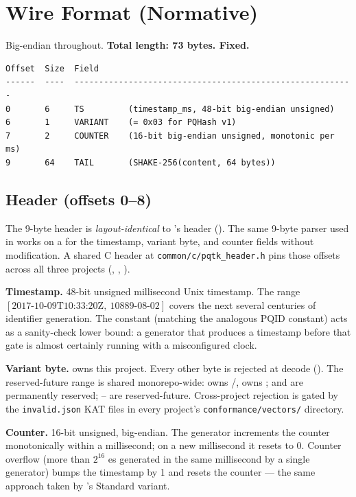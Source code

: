 \section{Wire Format (Normative)}
\label{sec:wire-format}

Big-endian throughout. \textbf{Total length: 73 bytes. Fixed.}

\begin{lstlisting}[language=Pseudocode]
Offset  Size  Field
------  ----  ---------------------------------------------------------
0       6     TS         (timestamp_ms, 48-bit big-endian unsigned)
6       1     VARIANT    (= 0x03 for PQHash v1)
7       2     COUNTER    (16-bit big-endian unsigned, monotonic per ms)
9       64    TAIL       (SHAKE-256(content, 64 bytes))
\end{lstlisting}

\subsection{Header (offsets 0--8)}

The 9-byte header is \emph{layout-identical} to \pqid{}'s header (). The same 9-byte parser used in \pqid{} works on a \pqhash{} for the timestamp, variant byte, and counter fields without modification. A shared C header at \texttt{common/c/pqtk\_header.h} pins those offsets across all three \pqtoolkit{} projects (\pqid{}, \pqhash{}, \pqcrypt{}).

\textbf{Timestamp.} 48-bit unsigned millisecond Unix timestamp. The range $[2017\text{-}10\text{-}09\text{T}10\text{:}33\text{:}20\text{Z},\ 10889\text{-}08\text{-}02]$ covers the next several centuries of identifier generation. The constant  (matching the analogous PQID constant) acts as a sanity-check lower bound: a generator that produces a timestamp before that gate is almost certainly running with a misconfigured clock.

\textbf{Variant byte.}  owns this project. Every other byte is rejected at decode (). The reserved-future range is shared monorepo-wide: \pqid{} owns /, \pqcrypt{} owns ;  and  are permanently reserved; -- are reserved-future. Cross-project rejection is gated by the \texttt{invalid.json} KAT files in every project's \texttt{conformance/vectors/} directory.

\textbf{Counter.} 16-bit unsigned, big-endian. The generator increments the counter monotonically within a millisecond; on a new millisecond it resets to 0. Counter overflow (more than $2^{16}$ \pqhash{}es generated in the same millisecond by a single generator) bumps the timestamp by 1 and resets the counter --- the same approach taken by \pqid{}'s Standard variant.

